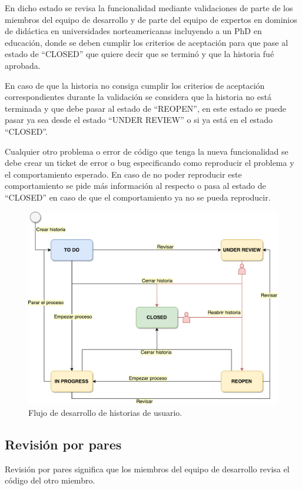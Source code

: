 En dicho estado se revisa la funcionalidad mediante validaciones de parte de los miembros del equipo de desarrollo y de parte del equipo de expertos en dominios de didáctica en universidades norteamericanas incluyendo a un PhD en educación, donde se deben cumplir los criterios de aceptación para que pase al estado de \enquote{CLOSED} que quiere decir que se terminó y que la historia fué aprobada.  

En caso de que la historia no consiga cumplir los criterios de aceptación correspondientes durante la validación se considera que la historia no está terminada y que debe pasar al estado de \enquote{REOPEN}, en este estado se puede pasar ya sea desde el estado \enquote{UNDER REVIEW} o si ya está en el estado \enquote{CLOSED}.

Cualquier otro problema o error de código que tenga la nueva funcionalidad se debe crear un ticket de error o bug especificando como reproducir el problema y el comportamiento esperado. En caso de no poder reproducir este comportamiento se pide más información al respecto o pasa al estado de \enquote{CLOSED} en caso de que el comportamiento ya no se pueda reproducir.

\begin{figure}[]
\centering
\includegraphics[scale=0.4]{img/workflow}
\caption{Flujo de desarrollo de historias de usuario.}
  \label{workflow}
\end{figure}

\subsection{Revisión por pares}
Revisión por pares significa que los miembros del equipo de desarrollo revisa el código del otro miembro.

